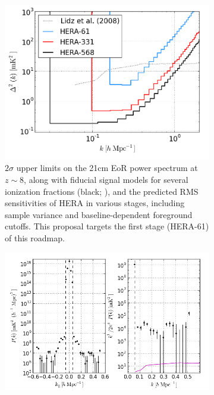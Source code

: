 \documentclass[preprint]{aastex}
\begin{document}
\begin{figure}[!ht]
	\centering
	\begin{subfigure}[b]{0.46\textwidth}
		\includegraphics[width=\textwidth]{plots/eor_pspec.png}
		\caption{
$2\sigma$ upper limits on the 21cm EoR power spectrum at $z\sim8$, along
with fiducial signal models for several ionization fractions (black;
\citealt{lidz_et_al2008}),
and the predicted RMS sensitivities of HERA in various stages, including sample variance
and baseline-dependent foreground cutoffs.  This proposal targets the first stage (HERA-61)
of this roadmap. %
}\label{fig:eor_pspec}
	\end{subfigure}
	\quad
	\begin{subfigure}[b]{0.46\textwidth}
		\includegraphics[width=\textwidth]{plots/pk_k3pk.png}

\end{subfigure}
\end{figure}
\end{document}
